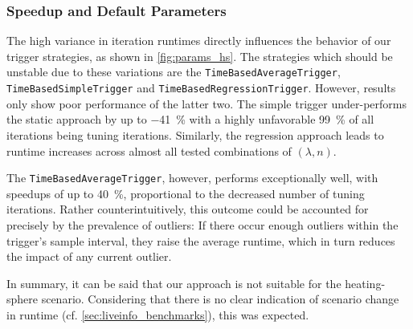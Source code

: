 

\subsubsection{Speedup and Default Parameters}
The high variance in iteration runtimes directly influences the behavior of our trigger strategies, as shown in \autoref{fig:params_hs}. The strategies which should be unstable due to these variations are the \texttt{TimeBasedAverageTrigger}, \texttt{TimeBasedSimpleTrigger} and \texttt{TimeBasedRegressionTrigger}. However, results only show poor performance of the latter two. The simple trigger under-performs the static approach by up to \qty{-41}{\percent} with a highly unfavorable \qty{99}{\percent} of all iterations being tuning iterations. Similarly, the regression approach leads to runtime increases across almost all tested combinations of $(\lambda, n)$.

The \texttt{TimeBasedAverageTrigger}, however, performs exceptionally well, with speedups of up to \qty{40}{\percent}, proportional to the decreased number of tuning iterations. Rather counterintuitively, this outcome could be accounted for precisely by the prevalence of outliers: If there occur enough outliers within the trigger's sample interval, they raise the average runtime, which in turn reduces the impact of any current outlier.

In summary, it can be said that our approach is not suitable for the heating-sphere scenario. Considering that there is no clear indication of scenario change in runtime (cf. \autoref{sec:liveinfo_benchmarks}), this was expected.


